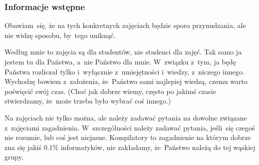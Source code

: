 \documentclass[10pt,t]{beamer}
\begin{document}
\begin{frame}
  \frametitle{Informacje wstępne}


  Obawiam~się, że na tych konkretnych zajęciach będzie sporo przynudzania,
  ale nie widzę sposobu, by~tego uniknąć.

  Według mnie to zajęcia są dla studentów, nie studenci dla zajęć. Tak samo
  ja jestem tu dla Państwa, a~nie Państwo dla mnie. W~związku z~tym, ja
  będę Państwa rozliczał tylko i~wyłącznie z~umiejętności i~wiedzy,
  z~niczego innego. Wychodzę bowiem z~założenia, że~Państwo sami najlepiej
  wiedzą, czemu warto poświęcić swój czas. (Choć jak dobrze wiemy, często
  po jakimś czasie stwierdzamy, że~może trzeba było wybrać coś innego.)

  Na zajęciach nie tylko można, ale \alert{należy} zadawać pytania
  na dowolne związane z~zajęciami zagadnienia. W~szczególności
  \alert{należy} zadawać pytania, jeśli~się czegoś nie rozumie, lub coś
  jest niejasne. Kompilatory to zagadnienie na którym dobrze zna się jakiś
  0.1\% informatyków, \alert{nie} zakładamy, że~Państwo należą do tej
  wąskiej grupy.




\end{frame}
\end{document}

